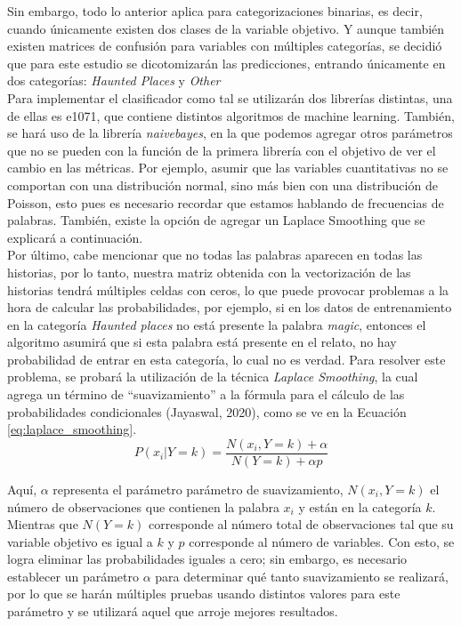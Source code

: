 \documentclass[12pt, letterpaper]{report}
\begin{document}
Sin embargo, todo lo anterior aplica para categorizaciones binarias, es decir, cuando únicamente existen dos clases de la variable objetivo. Y aunque también existen matrices de confusión para variables con múltiples categorías, se decidió que para este estudio se dicotomizarán las predicciones, entrando únicamente en dos categorías: \textit{Haunted Places} y \textit{Other} \\

Para implementar el clasificador como tal se utilizarán dos librerías distintas, una de ellas es e1071, que contiene distintos algoritmos de machine learning. También, se hará uso de la librería \textit{naivebayes}, en la que podemos agregar otros parámetros que no se pueden con la función de la primera librería con el objetivo de ver el cambio en las métricas. Por ejemplo, asumir que las variables cuantitativas no se comportan con una distribución normal, sino más bien con una distribución de Poisson, esto pues es necesario recordar que estamos hablando de frecuencias de palabras. También, existe la opción de agregar un Laplace Smoothing que se explicará a continuación.
\\

Por último, cabe mencionar que no todas las palabras aparecen en todas las historias, por lo tanto, nuestra matriz obtenida con la vectorización de las historias tendrá múltiples celdas con ceros, lo que puede provocar problemas a la hora de calcular las probabilidades, por ejemplo, si en los datos de entrenamiento en la categoría \textit{Haunted places} no está presente la palabra \textit{magic}, entonces el algoritmo asumirá que si esta palabra está presente en el relato, no hay probabilidad de entrar en esta categoría, lo cual no es verdad. Para resolver este problema, se probará la utilización de la técnica \textit{Laplace Smoothing}, la cual agrega un término de “suavizamiento” a la fórmula para el cálculo de las probabilidades condicionales (Jayaswal, 2020), como se ve en la Ecuación \ref{eq:laplace_smoothing}.
\begin{equation}
\label{eq:laplace_smoothing}
    P(x_i|Y=k)=\frac{N(x_i,Y=k)+\alpha}{N(Y=k)+\alpha p}
\end{equation}

Aquí, $\alpha$ representa el parámetro parámetro de suavizamiento, $N(x_i, Y=k)$ el número de observaciones que contienen la palabra $x_i$ y están en la categoría $k$. Mientras que $N(Y=k)$ corresponde al número total de observaciones tal que su variable objetivo es igual a $k$ y $p$ corresponde al número de variables. Con esto, se logra eliminar las probabilidades iguales a cero; sin embargo, es necesario establecer un parámetro $\alpha$ para determinar qué tanto suavizamiento se realizará, por lo que se harán múltiples pruebas usando distintos valores para este parámetro y se utilizará aquel que arroje mejores resultados.
\end{document}
